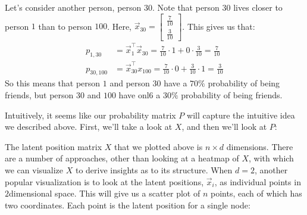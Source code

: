 \documentclass[letterpaper,10pt,english]{jupyterBook}
\begin{document}
\sphinxAtStartPar
Let’s consider another person, person \(30\). Note that person \(30\) lives closer to person \(1\) than to person \(100\).  Here, \(\vec x_{30} = \begin{bmatrix} \frac{7}{10}\\ \frac{3}{10}\end{bmatrix}\). This gives us that:
\begin{align*}
p_{1,30} &= \vec x_1^\top \vec x_{30} = \frac{7}{10}\cdot 1 + 0 \cdot \frac{3}{10} = \frac{7}{10} \\
p_{30, 100} &= \vec x_{30}^\top x_{100} = \frac{7}{10} \cdot 0 + \frac{3}{10} \cdot 1 = \frac{3}{10}
\end{align*}
\sphinxAtStartPar
So this means that person \(1\) and person \(30\) have a \(70\%\) probability of being friends, but person \(30\) and \(100\) have onl6 a \(30\%\) probability of being friends.

\sphinxAtStartPar
Intuitively, it seems like our probability matrix \(P\) will capture the intuitive idea we described above. First, we’ll take a look at \(X\), and then we’ll look at \(P\):

\begin{sphinxVerbatim}[commandchars=\\\{\}]
    

  
    
    \PYG{p}{[}\PYG{p}{]}  \PYG{p}{[}   \PYG{p}{]}
\end{sphinxVerbatim}

\noindent{}

\sphinxAtStartPar
The latent position matrix \(X\) that we plotted above is \(n \times d\) dimensions. There are a number of approaches, other than looking at a heatmap of \(X\), with which we can visualize \(X\) to derive insights as to its structure. When \(d=2\), another popular visualization is to look at the latent positions, \(\vec x_i\), as individual points in \(2\)\sphinxhyphen{}dimensional space. This will give us a scatter plot of \(n\) points, each of which has two coordinates. Each point is the latent position for a single node:
\end{document}
